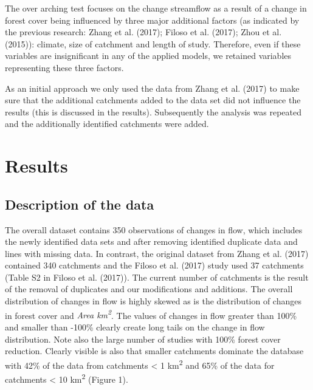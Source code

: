 \documentclass[]{elsarticle} %
\begin{document}
The over arching test focuses on the change streamflow as a result of a change in forest cover being influenced by three major additional factors (as indicated by the previous research: Zhang et al. (2017); Filoso et al. (2017); Zhou et al. (2015)): climate, size of catchment and length of study. Therefore, even if these variables are insignificant in any of the applied models, we retained variables representing these three factors.

As an initial approach we only used the data from Zhang et al. (2017) to make sure that the additional catchments added to the data set did not influence the results (this is discussed in the results). Subsequently the analysis was repeated and the additionally identified catchments were added.

\hypertarget{results}{%
\section{Results}\label{results}}

\hypertarget{description-of-the-data}{%
\subsection{Description of the data}\label{description-of-the-data}}

The overall dataset contains 350 observations of changes in flow, which includes the newly identified data sets and after removing identified duplicate data and lines with missing data. In contrast, the original dataset from Zhang et al. (2017) contained 340 catchments and the Filoso et al. (2017) study used 37 catchments (Table S2 in Filoso et al. (2017)). The current number of catchments is the result of the removal of duplicates and our modifications and additions. The overall distribution of changes in flow is highly skewed as is the distribution of changes in forest cover and \emph{Area km\textsuperscript{2}}. The values of changes in flow greater than 100\% and smaller than -100\% clearly create long tails on the change in flow distribution. Note also the large number of studies with 100\% forest cover reduction. Clearly visible is also that smaller catchments dominate the database with 42\% of the data from catchments \textless{} 1 km\textsuperscript{2} and 65\% of the data for catchments \textless{} 10 km\textsuperscript{2} (Figure 1).
\end{document}

